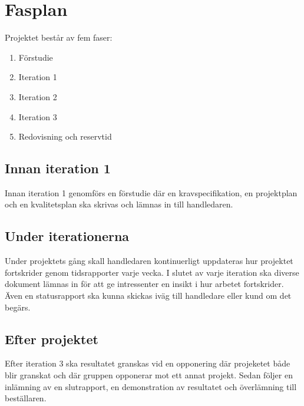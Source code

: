 \section{Fasplan}
Projektet består av fem faser:
\begin{enumerate}
\item Förstudie
\item Iteration 1
\item Iteration 2
\item Iteration 3
\item Redovisning och reservtid
\end{enumerate}

\subsection{Innan iteration 1}
Innan iteration 1 genomförs en förstudie där en  kravspecifikation, en projektplan och en kvalitetsplan ska skrivas och lämnas in till handledaren. 

\subsection{Under iterationerna}

Under projektets gång skall handledaren kontinuerligt uppdateras hur projektet fortskrider genom tidsrapporter varje vecka. I slutet av varje iteration ska diverse dokument lämnas in för att ge intressenter en insikt i hur arbetet fortskrider. Även en statusrapport ska kunna skickas iväg till handledare eller kund om det begärs. 


\subsection{Efter projektet}
Efter iteration 3 ska resultatet granskas vid en opponering där projeketet både blir granskat och där gruppen opponerar mot ett annat projekt. Sedan följer en inlämning av en slutrapport, en demonstration av resultatet och överlämning till beställaren. 
